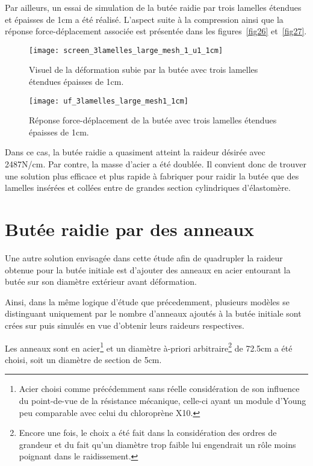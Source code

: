﻿\documentclass{article}
\newcommand{\abaqus}{\bsc{Abaqus}\xspace}
\begin{document}
Par ailleurs, un essai de simulation de la butée raidie par trois lamelles étendues et épaisses de 1cm a été réalisé. L'aspect suite à la compression ainsi que la réponse force-déplacement associée est présentée dans les figures~\ref{fig26} et~\ref{fig27}.

\begin{figure}[htbp]
	\begin{minipage}[c]{.45\linewidth}
	\begin{center}
	\texttt{[image: screen\_3lamelles\_large\_mesh\_1\_u1\_1cm]}
	\caption{Visuel de la déformation subie par la butée avec trois lamelles étendues épaisses de 1cm.}
	\label{fig24}
	\end{center}
	\end{minipage}
	\hfill
	\begin{minipage}[c]{.45\linewidth}
	\begin{center}
	\texttt{[image: uf\_3lamelles\_large\_mesh1\_1cm]}
	\caption{Réponse force-déplacement de la butée avec trois lamelles étendues épaisses de 1cm.}
	\label{fig25}
	\end{center}
	\end{minipage}
\end{figure}

Dans ce cas, la butée raidie a quasiment atteint la raideur désirée avec 2487N/cm. Par contre, la masse d'acier a été doublée. Il convient donc de trouver une solution plus efficace et plus rapide à fabriquer pour raidir la butée que des lamelles insérées et collées entre de grandes section cylindriques d'élastomère. 

\section{Butée raidie par des anneaux}
Une autre solution envisagée dans cette étude afin de quadrupler la raideur obtenue pour la butée initiale est d'ajouter des anneaux en acier entourant la butée sur son diamètre extérieur avant déformation.

Ainsi, dans la même logique d'étude que précedemment, plusieurs modèles se distinguant uniquement par le nombre d'anneaux ajoutés à la butée initiale sont crées sur \abaqus puis simulés en vue d'obtenir leurs raideurs respectives.

Les anneaux sont en acier\footnote{Acier choisi comme précédemment sans réelle considération de son influence du point-de-vue de la résistance mécanique, celle-ci ayant un module d'Young peu comparable avec celui du chloroprène X10.} et un diamètre à-priori arbitraire\footnote{Encore une fois, le choix a été fait dans la considération des ordres de grandeur et du fait qu'un diamètre trop faible lui engendrait un rôle moins poignant dans le raidissement.} de 72.5cm a été choisi, soit un diamètre de section de 5cm.
\end{document}
